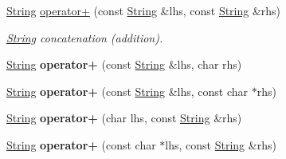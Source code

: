{\bf }\par
\begin{DoxyCompactItemize}
\item 
\hyperlink{classString}{String} \hyperlink{classString_a346acdf3143412eaab63e8f3664cd575}{operator+} (const \hyperlink{classString}{String} \&lhs, const \hyperlink{classString}{String} \&rhs)
\begin{DoxyCompactList}\small\item\em \hyperlink{classString}{String} concatenation (addition). \end{DoxyCompactList}\item 
\hypertarget{classString_a04dd51e6a07a2429189f2e95ed1d20fb}{\hyperlink{classString}{String} {\bfseries operator+} (const \hyperlink{classString}{String} \&lhs, char rhs)}\label{classString_a04dd51e6a07a2429189f2e95ed1d20fb}

\item 
\hypertarget{classString_a90015386d12dcad1a1150e0e3c6a0d8a}{\hyperlink{classString}{String} {\bfseries operator+} (const \hyperlink{classString}{String} \&lhs, const char $\ast$rhs)}\label{classString_a90015386d12dcad1a1150e0e3c6a0d8a}

\item 
\hypertarget{classString_a640d0ff4cab0efefd751943a8b83aa03}{\hyperlink{classString}{String} {\bfseries operator+} (char lhs, const \hyperlink{classString}{String} \&rhs)}\label{classString_a640d0ff4cab0efefd751943a8b83aa03}

\item 
\hypertarget{classString_ae3cd285a0b3bcf7d5f1b89dba89035d1}{\hyperlink{classString}{String} {\bfseries operator+} (const char $\ast$lhs, const \hyperlink{classString}{String} \&rhs)}\label{classString_ae3cd285a0b3bcf7d5f1b89dba89035d1}

\end{DoxyCompactItemize}

